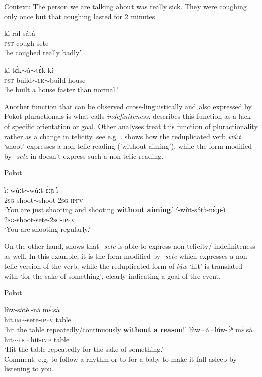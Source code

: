 \documentclass[output=paper,colorlinks,citecolor=brown
]{langscibook}
\begin{document}
\ea Context: The person we are talking about was really sick. They were coughing only once but that coughing lasted for 2 minutes. \label{ex:fiebig:cough}
\begin{xlist}
\ex 
\gll kì-rál-sátà\\
\textsc{pst}-cough-sete\\
\glt `he coughed really badly'
\end{xlist}
\z

\ea \label{ex:fiebig:build}
\gll kì-tɛ́k$\sim$à$\sim$tɛ̀k kí\\
\textsc{pst}-build$\sim$\textsc{lk}$\sim$build house\\
\glt `he built a house faster than normal.' 
\z



Another function that can be observed cross-linguistically and also expressed by Pokot pluractionals is what \citet{Mattiola2019} calls \textit{indefiniteness}. \citet[40]{Mattiola2019} describes this function as a lack of specific orientation or goal. Other analyses treat this function of pluractionality rather as a change in telicity, see e.g. \citet{Henderson2012}. 
 shows how the reduplicated verb \textit{wúːt} `shoot' expresses a non-telic reading ('without aiming'), while the form modified by \textit{-sete} in  doesn't express such a non-telic reading.


\ea Pokot \label{ex:fiebig:shoot-non telic}
\begin{xlist}
\ex 
\gll ìː-wúːt$\sim$wúːt-ɛ́ːɲ-ì\\
\textsc{2sg}-shoot$\sim$shoot-\textsc{2sg-ipfv}\\
\glt `You are just shooting and shooting \textbf{without aiming}.'
\ex \label{ex:fiebig:non-tel-shoot-b}
\gll í-wùt-sə́tə̀-nɛ́ːɲ-ì\\
2\textsc{sg}-shoot-sete-2\textsc{sg-ipfv}\\ 
\glt `You are shooting regularly.'
\end{xlist}
\z

\noindent On the other hand,  shows that \textit{-sete} is able to express non-telicity/ indefiniteness as well. In this example, it is the form modified by \textit{-sete} which expresses a non-telic version of the verb, while the reduplicated form of \textit{lùw} `hit' is translated with `for the sake of something', clearly indicating a goal of the event.


\ea Pokot \label{ex:fiebig:beat-non telic}
\begin{xlist}
\ex 
\gll lùw-sə́tèː-nə́ mɛ́ːsà\\
hit.\textsc{imp}-sete-\textsc{ipfv} table\\
\glt `hit the table repeatedly/continuously \textbf{without a reason}!'
\ex 
\gll lùw$\sim$á$\sim$lúw-ɔ́ʰ mɛ́ːsà\\
hit$\sim$\textsc{lk}$\sim$hit-\textsc{imp} table\\
\glt`Hit the table repeatedly for the sake of something.'\\
Comment: e.g. to follow a rhythm or to for a baby to make it fall asleep by listening to you.
\end{xlist}
\z
\end{document}
